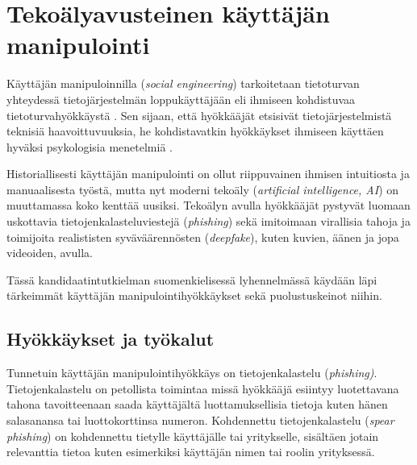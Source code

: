 

\chapter*{Tekoälyavusteinen käyttäjän\\manipulointi\label{chapter:finnish}}
\begin{comment}

Ohjeet:
    - 4 or 5 sivua
    - TOC ja Chapter 1 Introduction väliin

Kappaleet:
    - (ilman nimeä sisältää Introduction ja Definition kappaleet)
    - Hyökkäykset ja työkalut
    - Puolustuskeinot
    - Puolustuskeinojen arviointia
    - Yhteenveto
    - EI Overleaf kappalenumerointia? Kappale "0"?
    

\end{comment}


Käyttäjän manipuloinnilla (\textit{social engineering}) tarkoitetaan tietoturvan yhteydessä tietojärjestelmän loppukäyttäjään eli ihmiseen kohdistuvaa tietoturvahyökkäystä \citep{mitnick_The_Art_of_Deception_2003}. Sen sijaan, että hyökkääjät etsisivät tietojärjestelmistä teknisiä haavoittuvuuksia, he kohdistavatkin hyökkäykset ihmiseen käyttäen hyväksi psykologisia menetelmiä \citep{wang_Defining_Social_Engineering_2020}.

Historiallisesti käyttäjän manipulointi on ollut riippuvainen ihmisen intuitiosta ja manuaalisesta työstä, mutta nyt moderni tekoäly (\textit{artificial intelligence, AI}) on muuttamassa koko kenttää uusiksi. Tekoälyn avulla hyökkääjät pystyvät luomaan uskottavia tietojenkalasteluviestejä (\textit{phishing}) sekä imitoimaan virallisia tahoja ja toimijoita realististen syväväärennösten (\textit{deepfake}), kuten kuvien, äänen ja jopa videoiden, avulla.

Tässä kandidaatintutkielman suomenkielisessä lyhennelmässä käydään läpi tärkeimmät käyttäjän manipulointihyökkäykset sekä puolustuskeinot niihin.

\section*{Hyökkäykset ja työkalut}

Tunnetuin käyttäjän manipulointihyökkäys on tietojenkalastelu (\textit{phishing)}. Tietojenkalastelu on petollista toimintaa missä hyökkääjä esiintyy luotettavana tahona tavoitteenaan saada käyttäjältä luottamuksellisia tietoja kuten hänen salasanansa tai luottokorttinsa numeron. Kohdennettu tietojenkalastelu (\textit{spear phishing}) on kohdennettu tietylle käyttäjälle tai yritykselle, sisältäen jotain relevanttia tietoa kuten esimerkiksi käyttäjän nimen tai roolin yrityksessä.

